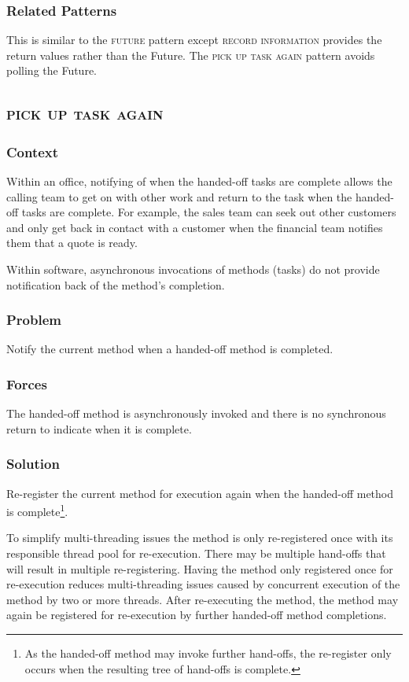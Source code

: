 \documentclass[prodmode]{style/acmlarge}
\begin{document}
\subsubsection*{Related Patterns} This is similar to the \textsc{future} pattern
\cite{concurrent-java} except \textsc{record information} provides the return
values rather than the Future.  The \textsc{pick up task again} pattern avoids
polling the Future.



\subsection{\textsc{\textbf{pick up task again}}}

\subsubsection*{Context} Within an office, notifying of when the handed-off tasks
are complete allows the calling team to get on with other work and return to the
task when the handed-off tasks are complete.  For example, the sales team can
seek out other customers and only get back in contact with a customer when the
financial team notifies them that a quote is ready.

Within software, asynchronous invocations of methods (tasks) do not provide
notification back of the method's completion.

\subsubsection*{\textbf{Problem}} Notify the current method when a handed-off method is
completed.

\subsubsection*{Forces} The handed-off method is asynchronously invoked and there is
no synchronous return to indicate when it is complete.

\subsubsection*{\textbf{Solution}} Re-register the current method for execution again
when the handed-off method is complete\footnote{As the handed-off method may
invoke further hand-offs, the re-register only occurs when the resulting tree of
hand-offs is complete.}.

To simplify multi-threading issues the method is only re-registered once with
its responsible thread pool for re-execution.  There may be multiple hand-offs
that will result in multiple re-registering.  Having the method only registered
once for re-execution reduces multi-threading issues caused by concurrent
execution of the method by two or more threads.  After re-executing the method,
the method may again be registered for re-execution by further handed-off method
completions.
\end{document}
